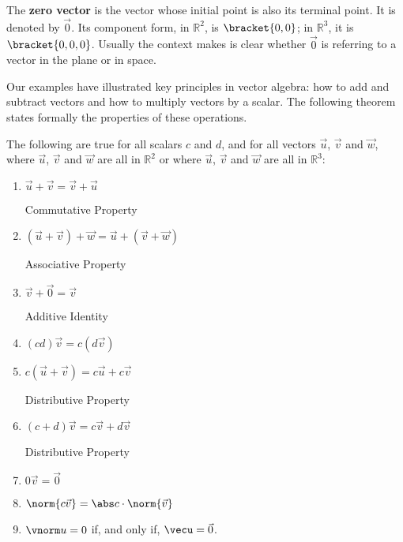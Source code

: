 The \textbf{zero vector} is the vector whose initial point is also its terminal point. It is denoted by $\vec 0$. Its component form, in $\mathbb{R}^2$, is $\bracket{0,0}$; in $\mathbb{R}^3$, it is $\bracket{0,0,0}$. Usually the context makes is clear whether $\vec 0$ is referring to a vector in the plane or in space.

Our examples have illustrated key principles in vector algebra: how to add and subtract vectors and how to multiply vectors by a scalar. The following theorem states formally the properties of these operations.

\begin{theorem}\label{thm:vector_properties}
The following are true for all scalars $c$ and $d$, and for all vectors $\vec u$, $\vec v$ and $\vec w$, where $\vec u$, $\vec v$ and $\vec w$ are all in $\mathbb{R}^2$ or where $\vec u$, $\vec v$ and $\vec w$ are all in $\mathbb{R}^3$:
\begin{enumerate}
	\item \parbox{150pt}{$\vec u+\vec v = \vec v+\vec u$}Commutative Property
	\item \parbox{150pt}{$(\vec u+\vec v)+\vec w = \vec u+(\vec v+\vec w)$}Associative Property
	\item \parbox{150pt}{$\vec v+\vec 0 = \vec v$}Additive Identity
	\item \parbox{150pt}{$(cd)\vec v= c(d\vec v)$}
	\item \parbox{150pt}{$c(\vec u+\vec v) = c\vec u+c\vec v$}Distributive Property
	\item \parbox{150pt}{$(c+d)\vec v = c\vec v+d\vec v$}Distributive Property
	\item \parbox{150pt}{$0\vec v = \vec 0$}
	\item	\parbox{150pt}{$\norm{c\vec v} = \abs c\cdot\norm{\vec v}$}\label{thm:norm_prop}
	\item	$\vnorm u = 0$ if, and only if, $\vecu = \vec 0$.  \label{thm:zero_norm}
\end{enumerate}
\end{theorem}

%

